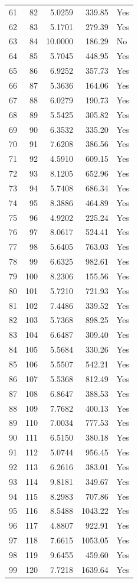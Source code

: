 \documentclass[11pt]{article}
\begin{document}
\begin{longtable}{rrrrl}
61 & 82 & 5.0259 & 339.85 & Yes \\
62 & 83 & 5.1701 & 279.39 & Yes \\
63 & 84 & 10.0000 & 186.29 & No \\
64 & 85 & 5.7045 & 448.95 & Yes \\
65 & 86 & 6.9252 & 357.73 & Yes \\
66 & 87 & 5.3636 & 164.06 & Yes \\
67 & 88 & 6.0279 & 190.73 & Yes \\
68 & 89 & 5.5425 & 305.82 & Yes \\
69 & 90 & 6.3532 & 335.20 & Yes \\
70 & 91 & 7.6208 & 386.56 & Yes \\
71 & 92 & 4.5910 & 609.15 & Yes \\
72 & 93 & 8.1205 & 652.96 & Yes \\
73 & 94 & 5.7408 & 686.34 & Yes \\
74 & 95 & 8.3886 & 464.89 & Yes \\
75 & 96 & 4.9202 & 225.24 & Yes \\
76 & 97 & 8.0617 & 524.41 & Yes \\
77 & 98 & 5.6405 & 763.03 & Yes \\
78 & 99 & 6.6325 & 982.61 & Yes \\
79 & 100 & 8.2306 & 155.56 & Yes \\
80 & 101 & 5.7210 & 721.93 & Yes \\
81 & 102 & 7.4486 & 339.52 & Yes \\
82 & 103 & 5.7368 & 898.25 & Yes \\
83 & 104 & 6.6487 & 309.40 & Yes \\
84 & 105 & 5.5684 & 330.26 & Yes \\
85 & 106 & 5.5507 & 542.21 & Yes \\
86 & 107 & 5.5368 & 812.49 & Yes \\
87 & 108 & 6.8647 & 388.53 & Yes \\
88 & 109 & 7.7682 & 400.13 & Yes \\
89 & 110 & 7.0034 & 777.53 & Yes \\
90 & 111 & 6.5150 & 380.18 & Yes \\
91 & 112 & 5.0744 & 956.45 & Yes \\
92 & 113 & 6.2616 & 383.01 & Yes \\
93 & 114 & 9.8181 & 349.67 & Yes \\
94 & 115 & 8.2983 & 707.86 & Yes \\
95 & 116 & 8.5488 & 1043.22 & Yes \\
96 & 117 & 4.8807 & 922.91 & Yes \\
97 & 118 & 7.6615 & 1053.05 & Yes \\
98 & 119 & 9.6455 & 459.60 & Yes \\
99 & 120 & 7.7218 & 1639.64 & Yes \\
\end{longtable}
\end{document}
